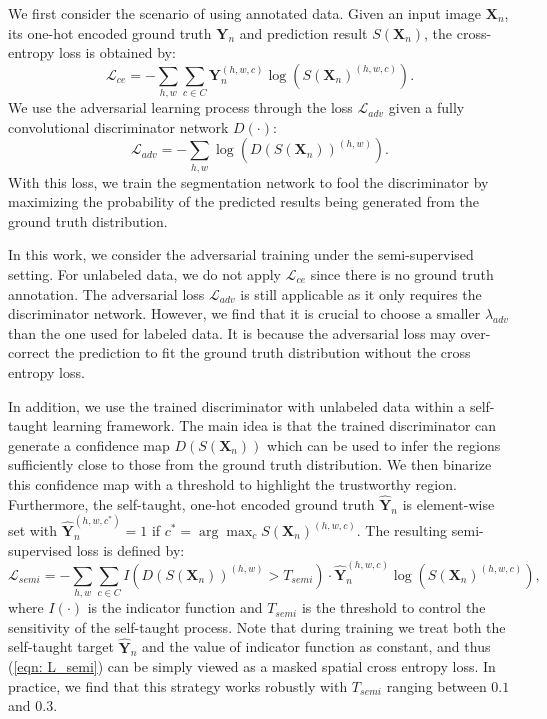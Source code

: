 \documentclass{bmvc2k}
\begin{document}
	We first consider the scenario of using annotated data. Given an input image $\mathbf{X}_n$, its one-hot encoded ground truth $\mathbf{Y}_n$ and prediction result $S(\mathbf{X}_n)$, the cross-entropy loss is obtained by:
	\begin{equation}
		\mathcal{L}_{ce} = - \sum_{h,w}{} \sum_{c \in C}{} \mathbf{Y}_n^{(h,w,c)} \log(S(\mathbf{X}_n)^{(h,w,c)}).
	\end{equation}
	We use the adversarial learning process through the loss $\mathcal{L}_{adv}$ given a fully convolutional discriminator network $D(\cdot)$:
	\begin{equation}
		\mathcal{L}_{adv} = - \sum_{h,w}{} \log(D(S(\mathbf{X}_n))^{(h,w)}).
	\end{equation}
	With this loss, we train the segmentation network to fool the discriminator by maximizing the probability of the predicted results being generated from the ground truth distribution.
	
	\vspace{-2mm}{\flushleft \bf Training with unlabeled data.}
	In this work, we consider the adversarial training under the semi-supervised setting.
	For unlabeled data, we do not apply $\mathcal{L}_{ce}$ since there is no ground truth annotation.
	The adversarial loss $\mathcal{L}_{adv}$ is still applicable as it only requires the discriminator network.
	However, we find that it is crucial to choose a smaller $\lambda_{adv}$ than the one 
	used for labeled data.
	It is because the adversarial loss may over-correct the prediction to fit the ground truth distribution without the cross entropy loss.
	
	In addition, we use the trained discriminator with unlabeled data within a  
	self-taught learning framework.
	The main idea is that the trained discriminator can generate a confidence 
	map $D(S(\mathbf{X}_n))$ which can be used to infer the regions 
	sufficiently close to those from the ground truth distribution.
	We then binarize this confidence map with a threshold to highlight the trustworthy region. %
	Furthermore, the self-taught, one-hot encoded ground truth $\mathbf{\hat{Y}}_n$ is element-wise set with $\mathbf{\hat{Y}}_n^{(h,w,c^*)} = 1$ if $c^* = \arg \max_cS(\mathbf{X}_n)^{(h,w,c)}.$
	The resulting semi-supervised loss is defined by:
	\begin{equation}
		\label{eqn: L_semi}
		\mathcal{L}_{semi} = - \sum_{h,w}{} \sum_{c \in C}{} I(D(S(\mathbf{X}_n))^{(h,w)} > T_{semi}) \cdot \mathbf{\hat{Y}}_n^{(h,w,c)} \log(S(\mathbf{X}_n)^{(h,w,c)}),
	\end{equation}
	where $I(\cdot)$ is the indicator function and $T_{semi}$ is the threshold to control the sensitivity of the self-taught process.
	Note that during training we treat both the self-taught target $\mathbf{\hat{Y}}_n$ and the value of indicator function as constant, and thus (\ref{eqn: L_semi}) can be simply viewed as a masked spatial cross entropy loss.
	In practice, we find that this strategy works robustly with $T_{semi}$ ranging between $0.1$ and $0.3$.
	
\end{document}
